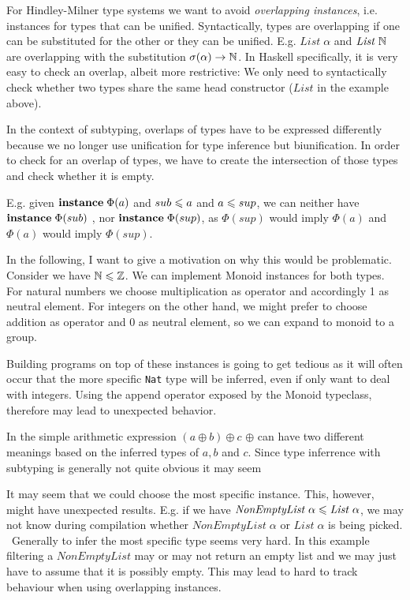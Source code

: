   For Hindley-Milner type systems we want to avoid \emph{overlapping instances}, i.e. instances for types that can be unified. \cite{peytonjones1997type}
  Syntactically, types are overlapping if one can be substituted for the other or they can be unified.
  E.g. $\mathit{List} \; \alpha$ and $\mathit{List} \; \mathbb{N}$ are overlapping with the substitution $\sigma(\alpha) \to \mathbb{N}$.
  In Haskell specifically, it is very easy to check an overlap, albeit more restrictive: We only need to syntactically check whether two types share the same head constructor ($\mathit{List}$ in the example above).

  In the context of subtyping, overlaps of types have to be expressed differently because we no longer use unification for type inference but biunification.
  In order to check for an overlap of types, we have to create the intersection of those types and check whether it is empty.

  E.g. given ${\bf instance} \; \Phi(a)$ and $sub \leqslant a$ and $a \leqslant sup$, we can neither have ${\bf instance} \; \Phi(sub)$ , nor ${\bf instance} \; \Phi(sup)$,
  as $\Phi(sup)$ would imply $\Phi(a)$ and $\Phi(a)$ would imply $\Phi(sup)$.

  In the following, I want to give a motivation on why this would be problematic.
  Consider we have $\mathbb{N} \leqslant \mathbb{Z}$.
  We can implement Monoid instances for both types. For natural numbers we choose multiplication as operator and accordingly 1 as neutral element.
  For integers on the other hand, we might prefer to choose addition as operator and 0 as neutral element, so we can expand to monoid to a group.

  Building programs on top of these instances is going to get tedious as it will often occur that the more specific \texttt{Nat} type will be inferred,
  even if only want to deal with integers.
  Using the append operator exposed by the Monoid typeclass, therefore may lead to unexpected behavior.

  In the simple arithmetic expression $(a \oplus b) \oplus c$ $\oplus$ can have two different meanings based on the inferred types of $a,b$ and $c$.
  Since type inferrence with subtyping is generally not quite obvious it may seem 

  It may seem that we could choose the most specific instance. This, however, might have unexpected results.
  E.g. if we have $\mathit{NonEmptyList} \; \alpha \leqslant \mathit{List} \; \alpha$, we may not know during compilation whether $\mathit{NonEmptyList} \; \alpha $ or $\mathit{List} \; \alpha$ is being picked.
  ~Generally to infer the most specific type seems very hard. In this example filtering a $\mathit{NonEmptyList}$ may or may not return an empty list and we may just have to assume that it is possibly empty.
  This may lead to hard to track behaviour when using overlapping instances.

